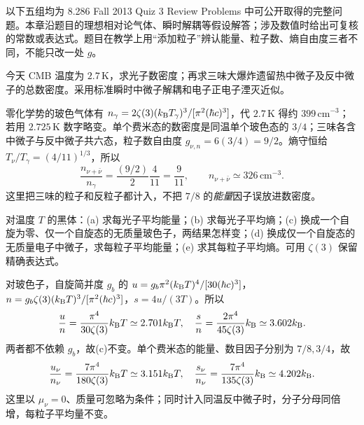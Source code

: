 以下五组均为 8.286 Fall 2013 Quiz 3 Review Problems 中可公开取得的完整问题。本章沿题目的理想相对论气体、瞬时解耦等假设解答；涉及数值时给出可复核的常数或表达式。题目在教学上用“添加粒子”辨认能量、粒子数、熵自由度三者不同，不能只改一处 $g$。

\begin{exercise}
今天 CMB 温度为 $2.7\,\mathrm K$，求光子数密度；再求三味大爆炸遗留热中微子及反中微子的总数密度。采用标准瞬时中微子解耦和电子正电子湮灭近似。
\end{exercise}
\begin{solution}
零化学势的玻色气体有 $n_\gamma=2\zeta(3)(k_{\mathrm B} T_\gamma)^3/[\pi^2(\hbar c)^3]$，代 $2.7\,\mathrm K$ 得约 $399\,\mathrm{cm}^{-3}$；若用 $2.725\,\mathrm K$ 数字略变。单个费米态的数密度是同温单个玻色态的 $3/4$；三味各含中微子与反中微子共六态，粒子数自由度 $g_{\nu,n}=6(3/4)=9/2$。熵守恒给 $T_\nu/T_\gamma=(4/11)^{1/3}$，所以
\[
\frac{n_{\nu+\bar\nu}}{n_\gamma}=\frac{(9/2)}2\frac4{11}=\frac9{11},
\qquad n_{\nu+\bar\nu}\simeq326\,\mathrm{cm}^{-3}.
\]
这里把三味的粒子和反粒子都计入，不把 $7/8$ 的\emph{能量}因子误放进数密度。
\end{solution}

\begin{exercise}
对温度 $T$ 的黑体：(a) 求每光子平均能量；(b) 求每光子平均熵；(c) 换成一个自旋为零、仅一个自旋态的无质量玻色子，两结果怎样变；(d) 换成仅一个自旋态的无质量电子中微子，求每粒子平均能量；(e) 求其每粒子平均熵。可用 $\zeta(3)$ 保留精确表达式。
\end{exercise}
\begin{solution}
对玻色子，自旋简并度 $g_b$ 的 $u=g_b\pi^2(k_{\mathrm B} T)^4/[30(\hbar c)^3]$，$n=g_b\zeta(3)(k_{\mathrm B} T)^3/[\pi^2(\hbar c)^3]$，$s=4u/(3T)$。所以
\[
\frac un=\frac{\pi^4}{30\zeta(3)}k_{\mathrm B} T\simeq2.701k_{\mathrm B} T,\quad
\frac sn=\frac{2\pi^4}{45\zeta(3)}k_{\mathrm B}\simeq3.602k_{\mathrm B}.
\]
两者都不依赖 $g_b$，故(c)不变。单个费米态的能量、数目因子分别为 $7/8,3/4$，故
\[
\frac{u_\nu}{n_\nu}=\frac{7\pi^4}{180\zeta(3)}k_{\mathrm B} T\simeq3.151k_{\mathrm B} T,\quad
\frac{s_\nu}{n_\nu}=\frac{7\pi^4}{135\zeta(3)}k_{\mathrm B}\simeq4.202k_{\mathrm B} .
\]
这里以 $\mu_\nu=0$、质量可忽略为条件；同时计入同温反中微子时，分子分母同倍增，每粒子平均量不变。
\end{solution}


